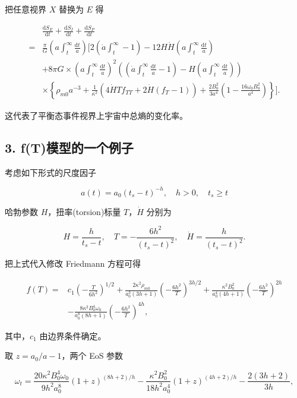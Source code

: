 \documentclass[aps,prl,preprint,groupedaddress,showkeys]{revtex4-2}
\begin{document}
把任意视界 $X$ 替换为 $E$ 得

$$
\begin{aligned}
    &\frac{\mathrm{d}S_E}{\mathrm{d}t} + \frac{\mathrm{d}S_I}{\mathrm{d}t} + \frac{\mathrm{d}S_P}{\mathrm{d}t} \\
    =&\frac{\pi}{G} \left(a\int_t^\infty \frac{\mathrm{d}t}{a}\right)\bigg[2\left(\dot{a}\int_t^\infty -1 \right) - 12H\dot{H} \left(a\int_t^\infty \frac{\mathrm{d}t}{a}\right) \\
    &+8\pi G\times \left(a\int_t^\infty\frac{\mathrm{d}t}{a}\right)^2\left(\left(\dot{a}\int_t^\infty\frac{\mathrm{d}t}{a}-1\right)-H\left(a\int_t^\infty\frac{\mathrm{d}t}{a}\right)\right) \\
    &\times \left\{\rho_{m0}a^{-3} + \frac{1}{\kappa^2} \left(4\dot{H}T f_{TT} + 2\dot{H}(f_T-1)\right) + \frac{2B_0^2}{3a^4}\left(1-\frac{16\omega_0B_0^2}{a^4}\right) \right\} \bigg]. 
\end{aligned}
$$

这代表了平衡态事件视界上宇宙中总熵的变化率。

\subsection{3. f(T)模型的一个例子}

考虑如下形式的尺度因子

$$
a(t)
=a_0\left(t_s-t \right)^{-h},\quad
h>0,\quad t_s\geq t
$$

哈勃参数 $H$，扭率(torsion)标量 $T$，$\dot{{H}}$ 分别为

$$
H = \frac{h }{t_s - t } ,\quad
T = -\frac{6h^2 }{\left(t_s-t \right)^2 } ,\quad
\dot{H} = \frac{h }{\left(t_s - t \right)^2 }.
$$

把上式代入修改 Friedmann 方程可得

$$
\begin{aligned}
    f(T)
    =&c_1\left(-\frac{T }{6h^2 }  \right)^{1/2} + \frac{2\kappa^2 \rho_{m0} }{a_0^3\left(3h+1 \right) } \left(-\frac{6h^2 }{T }  \right)^{3h/2} + \frac{\kappa^2 B_0^2 }{a_0^4\left(4h+1 \right) } \left(-\frac{6h^2 }{T }  \right)^{2h} \\
    &- \frac{8\kappa^2 B_0^4 \omega_0 }{a_0^8 \left(8h+1 \right) } \left(-\frac{6h^2 }{T }  \right)^{4h},
\end{aligned}
$$

其中，$c_1$ 由边界条件确定。

取 $z=a_0/a - 1$，两个 EoS 参数

$$
\omega_t
=\frac{20\kappa^2 B_0^4 \omega_0 }{9h^2a_0^8 } \left(1+z \right)^{(8h+2)/h} - \frac{\kappa^2 B_0^2 }{18h^2 a_0^4 } (1+z)^{(4h+2)/h} - \frac{2(3h+2) }{3h } ,
$$
\end{document}

